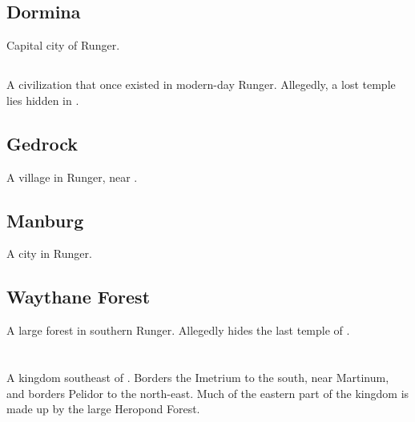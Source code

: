 \subsection{Dormina}
Capital city of Runger. 









\subsection{\EreshKal}
\index{\EreshKal}
A \meccaran{} civilization that once existed in modern-day Runger. Allegedly, a lost \EreshKali{} temple lies hidden in .  









\subsection{Gedrock}
A village in Runger, near . 









\subsection{Manburg}
A city in Runger. 









\subsection{Waythane Forest}
A large forest in southern Runger. Allegedly hides the last temple of . 















\section[Scyrum]{\Scyrum}
\index{\Scyrum}
A kingdom southeast of \Velcad{}. 
Borders the Imetrium to the south, near Martinum, and borders Pelidor to the north-east. 
Much of the eastern part of the kingdom is made up by the large Heropond Forest. 

